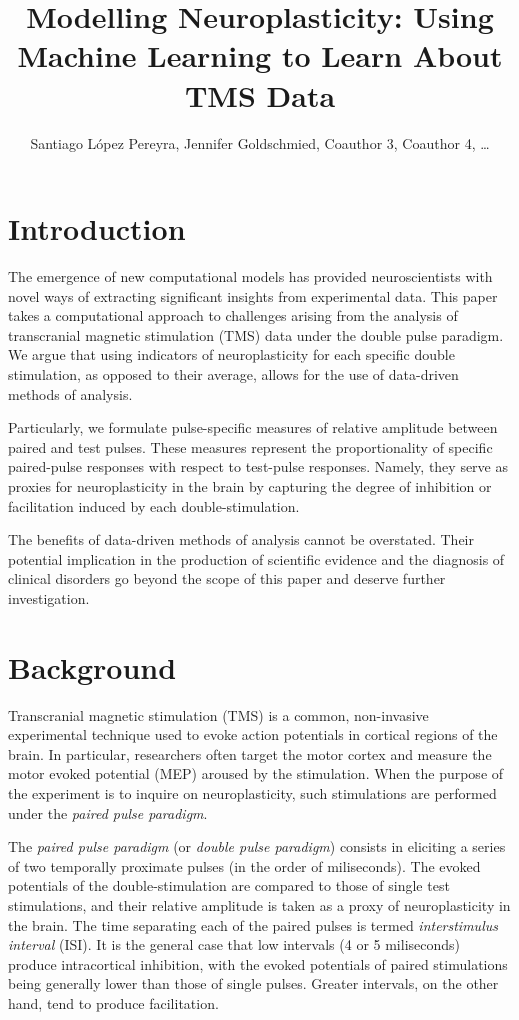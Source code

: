 \documentclass{article}
\title{\textbf{Modelling Neuroplasticity: Using Machine Learning to Learn About TMS Data}}
\author{Santiago López Pereyra, Jennifer Goldschmied, Coauthor 3,
Coauthor 4, \ldots}
\begin{document}
 

\begin{multicols}{2}

\section{Introduction}

The emergence of new computational models has provided neuroscientists with
novel ways of extracting significant insights from experimental data. This paper
takes a computational approach to challenges arising from the analysis of
transcranial magnetic stimulation (TMS) data under the double pulse paradigm. We
argue that using indicators of neuroplasticity for each specific double
stimulation, as opposed to their average, allows for the use of data-driven
methods of analysis. 

Particularly, we formulate pulse-specific measures of relative amplitude between
paired and test pulses. These measures represent the proportionality of specific
paired-pulse responses with respect to test-pulse responses. Namely, they serve as
proxies for neuroplasticity in the brain by capturing the degree of
inhibition or facilitation induced by each double-stimulation.

The benefits of data-driven methods of analysis cannot be overstated. Their
potential implication in the production of scientific evidence and the
diagnosis of clinical disorders go beyond the scope of this paper and deserve
further investigation.


\section{Background}

Transcranial magnetic stimulation (TMS) is a common,
non-invasive experimental technique used to evoke action
potentials in cortical regions of the brain. In particular,
researchers often target the motor cortex and measure the
motor evoked potential (MEP) aroused by the stimulation.
When the purpose of the experiment is to inquire on
neuroplasticity, such stimulations are performed under the
\textit{paired pulse paradigm}.

The \textit{paired pulse paradigm} (or \textit{double pulse
paradigm}) consists in eliciting a series of two temporally
proximate pulses (in the order of miliseconds). The evoked
potentials of the double-stimulation are compared to those
of single test stimulations, and their relative amplitude is
taken as a proxy of neuroplasticity in the brain. The time
separating each of the paired pulses is termed
\textit{interstimulus interval} (ISI). It is the general
case that low intervals (4 or 5 miliseconds) produce
intracortical inhibition, with the evoked potentials of
paired stimulations being generally lower than those of
single pulses. Greater intervals, on the other hand, tend to
produce facilitation. 



\end{multicols}
\end{document}
